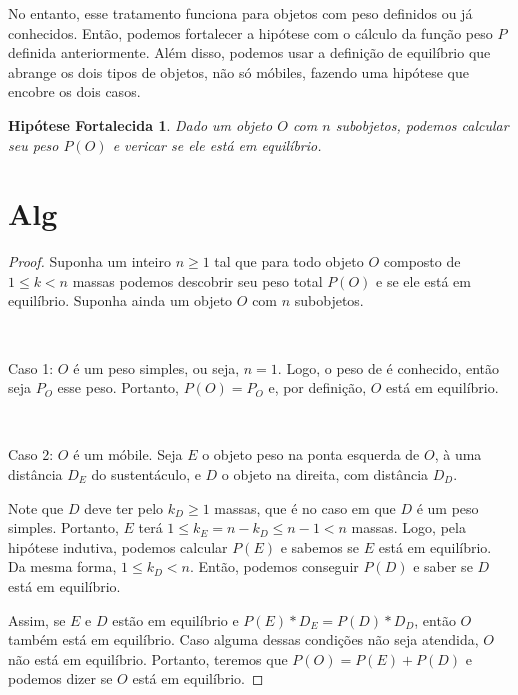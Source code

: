 \documentclass[a4paper, 14pt]{extarticle}
\newtheorem*{hypothesisf}{Hipótese Fortalecida}
\begin{document}
    No entanto, esse tratamento funciona para objetos com peso definidos ou já conhecidos. Então, podemos fortalecer a hipótese com o cálculo da função peso $P$ definida anteriormente. Além disso, podemos usar a definição de equilíbrio que abrange os dois tipos de objetos, não só móbiles, fazendo uma hipótese que encobre os dois casos.

    \begin{hypothesisf}
        Dado um objeto $O$ com $n$ subobjetos, podemos calcular seu peso $P(O)$ e vericar se ele está em equilíbrio.
    \end{hypothesisf}

\section{Alg}

    \begin{proof}
        Suponha um inteiro $n \geq 1$ tal que para todo objeto $O$ composto de $1 \leq k < n$ massas podemos descobrir seu peso total $P(O)$ e se ele está em equilíbrio. Suponha ainda um objeto $O$ com $n$ subobjetos.

        ~

        Caso 1: $O$ é um peso simples, ou seja, $n = 1$. Logo, o peso de é conhecido, então seja $P_O$ esse peso. Portanto, $P(O) = P_O$ e, por definição, $O$ está em equilíbrio.

        ~

        Caso 2: $O$ é um móbile. Seja $E$ o objeto peso na ponta esquerda de $O$, à uma distância $D_E$ do sustentáculo, e $D$ o objeto na direita, com distância $D_D$.

        Note que $D$ deve ter pelo $k_D \geq 1$ massas, que é no caso em que $D$ é um peso simples. Portanto, $E$ terá $1 \leq k_E = n - k_D \leq n - 1 < n$ massas. Logo, pela hipótese indutiva, podemos calcular $P(E)$ e sabemos se $E$ está em equilíbrio. Da mesma forma, $1 \leq k_D < n$. Então, podemos conseguir $P(D)$ e saber se $D$ está em equilíbrio.

        Assim, se $E$ e $D$ estão em equilíbrio e $P(E) * D_E = P(D) * D_D$, então $O$ também está em equilíbrio. Caso alguma dessas condições não seja atendida, $O$ não está em equilíbrio. Portanto, teremos que $P(O) = P(E) + P(D)$ e podemos dizer se $O$ está em equilíbrio.
    \end{proof}



\end{document}
